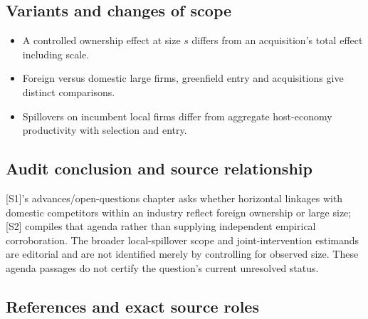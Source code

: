 \documentclass[11pt,a4paper]{article}
\begin{document}
\subsection*{Variants and changes of scope}

\begin{itemize}
\item A controlled ownership effect at size \(s\) differs from an acquisition's total effect including scale.
\item Foreign versus domestic large firms, greenfield entry and acquisitions give distinct comparisons.
\item Spillovers on incumbent local firms differ from aggregate host-economy productivity with selection and entry.
\end{itemize}

\subsection*{Audit conclusion and source relationship}

[S1]'s advances/open-questions chapter asks whether horizontal linkages with domestic competitors within an industry reflect foreign ownership or large size; [S2] compiles that agenda rather than supplying independent empirical corroboration. The broader local-spillover scope and joint-intervention estimands are editorial and are not identified merely by controlling for observed size. These agenda passages do not certify the question's current unresolved status.

\subsection*{References and exact source roles}
\end{document}
